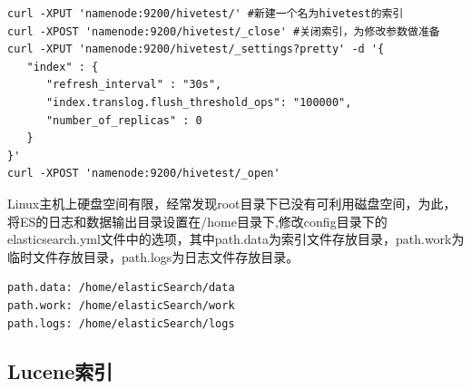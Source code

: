 \begin{verbatim}
curl -XPUT 'namenode:9200/hivetest/' #新建一个名为hivetest的索引
curl -XPOST 'namenode:9200/hivetest/_close' #关闭索引，为修改参数做准备
curl -XPUT 'namenode:9200/hivetest/_settings?pretty' -d '{
   "index" : {
      "refresh_interval" : "30s",
      "index.translog.flush_threshold_ops": "100000",
      "number_of_replicas" : 0
   }
}'
curl -XPOST 'namenode:9200/hivetest/_open'
\end{verbatim}
\par Linux主机上硬盘空间有限，经常发现root目录下已没有可利用磁盘空间，为此，将ES的日志和数据输出目录设置在/home目录下,修改config目录下的elasticsearch.yml文件中的选项，其中path.data为索引文件存放目录，path.work为临时文件存放目录，path.logs为日志文件存放目录。
\begin{verbatim}
path.data: /home/elasticSearch/data
path.work: /home/elasticSearch/work
path.logs: /home/elasticSearch/logs
\end{verbatim}
\subsection{Lucene索引}

